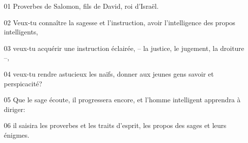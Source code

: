 01 Proverbes de Salomon, fils de David, roi d’Israël.

02 Veux-tu connaître la sagesse et l’instruction, avoir l’intelligence des propos intelligents,

03 veux-tu acquérir une instruction éclairée, – la justice, le jugement, la droiture –,

04 veux-tu rendre astucieux les naïfs, donner aux jeunes gens savoir et perspicacité?

05 Que le sage écoute, il progressera encore, et l’homme intelligent apprendra à diriger:

06 il saisira les proverbes et les traits d’esprit, les propos des sages et leurs énigmes.
